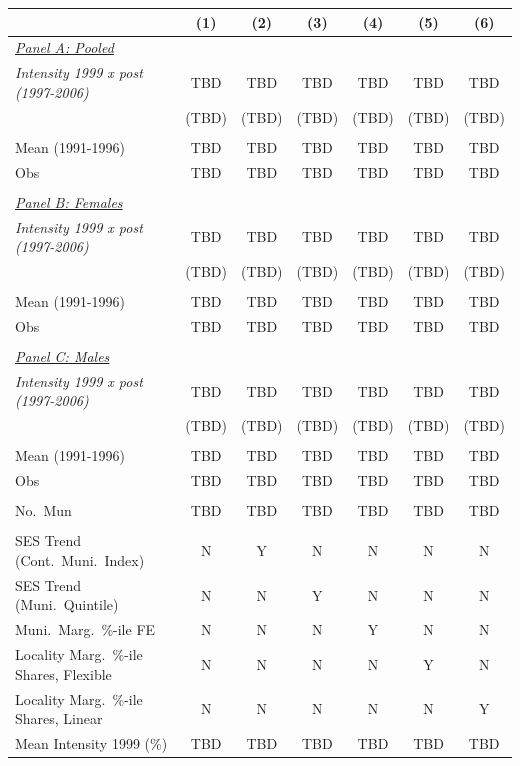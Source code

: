 \begin{tabular}{lcccccc} \hline \hline
& \multicolumn{1}{c}{(1)} & \multicolumn{1}{c}{(2)} & \multicolumn{1}{c}{(3)} & \multicolumn{1}{c}{(4)} & \multicolumn{1}{c}{(5)} & \multicolumn{1}{c}{(6)} \\ \toprule
\underline{\textit{Panel A: Pooled}}  \\
\textit{Intensity 1999 x post (1997-2006)} & TBD & TBD & TBD & TBD & TBD & TBD \\
 & (TBD) & (TBD) & (TBD) & (TBD) & (TBD) & (TBD) \\
  & & & & & & \\
Mean (1991-1996) & TBD & TBD & TBD & TBD & TBD & TBD \\
Obs & TBD & TBD & TBD & TBD & TBD & TBD \\
  & & & & & & \\
\underline{\textit{Panel B: Females}}  \\
\textit{Intensity 1999 x post (1997-2006)} & TBD & TBD & TBD & TBD & TBD & TBD \\
 & (TBD) & (TBD) & (TBD) & (TBD) & (TBD) & (TBD) \\
  & & & & & & \\
Mean (1991-1996) & TBD & TBD & TBD & TBD & TBD & TBD \\
Obs & TBD & TBD & TBD & TBD & TBD & TBD \\
  & & & & & & \\
\underline{\textit{Panel C: Males}}  \\
\textit{Intensity 1999 x post (1997-2006)} & TBD & TBD & TBD & TBD & TBD & TBD \\
 & (TBD) & (TBD) & (TBD) & (TBD) & (TBD) & (TBD) \\
  & & & & & & \\
Mean (1991-1996) & TBD & TBD & TBD & TBD & TBD & TBD \\
Obs & TBD & TBD & TBD & TBD & TBD & TBD \\
  & & & & & & \\
No.\ Mun & TBD & TBD & TBD & TBD & TBD & TBD \\
  & & & & & & \\
SES Trend (Cont.\ Muni.\ Index) & N & Y & N & N & N & N \\
SES Trend (Muni.\ Quintile) & N & N & Y & N & N & N \\
Muni.\ Marg.\ \%-ile FE & N & N & N & Y & N & N \\
Locality Marg.\ \%-ile Shares, Flexible & N & N & N & N & Y & N \\
Locality Marg.\ \%-ile Shares, Linear & N & N & N & N & N & Y \\
Mean Intensity 1999 (\%) & TBD & TBD & TBD & TBD & TBD & TBD \\
\bottomrule
\end{tabular}
